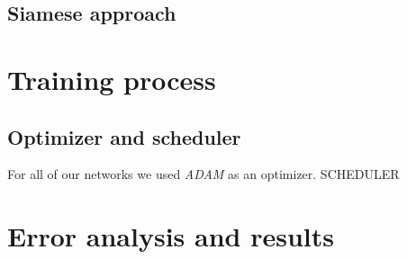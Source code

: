 \documentclass[conference]{IEEEtran}
\begin{document}
\subsection{Siamese approach}

\section{Training process}

\subsection{Optimizer and scheduler}
For all of our networks we used \emph{ADAM} \cite{Adam2014} as an optimizer. SCHEDULER




\section{Error analysis and results}
\end{document}
